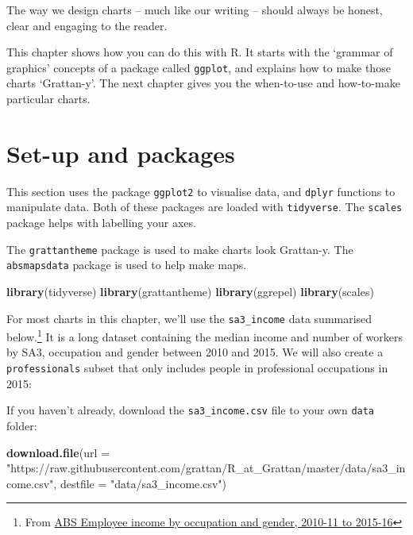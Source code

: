 \documentclass[
]{book}
\newenvironment{Shaded}{\begin{snugshade}}{\end{snugshade}}
\newcommand{\DataTypeTok}[1]{\textcolor[rgb]{0.13,0.29,0.53}{#1}}
\newcommand{\KeywordTok}[1]{\textcolor[rgb]{0.13,0.29,0.53}{\textbf{#1}}}
\newcommand{\NormalTok}[1]{#1}
\newcommand{\StringTok}[1]{\textcolor[rgb]{0.31,0.60,0.02}{#1}}
\begin{document}
The way we design charts -- much like our writing -- should always be honest, clear and engaging to the reader.

This chapter shows how you can do this with R. It starts with the `grammar of graphics' concepts of a package called \texttt{ggplot}, and explains how to make those charts `Grattan-y'. The next chapter gives you the when-to-use and how-to-make particular charts.

\hypertarget{set-up-and-packages}{%
\section{Set-up and packages}\label{set-up-and-packages}}

This section uses the package \texttt{ggplot2} to visualise data, and \texttt{dplyr} functions to manipulate data. Both of these packages are loaded with \texttt{tidyverse}. The \texttt{scales} package helps with labelling your axes.

The \texttt{grattantheme} package is used to make charts look Grattan-y. The \texttt{absmapsdata} package is used to help make maps.

\begin{Shaded}
\begin{Highlighting}[]
\KeywordTok{library}\NormalTok{(tidyverse)}
\KeywordTok{library}\NormalTok{(grattantheme)}
\KeywordTok{library}\NormalTok{(ggrepel)}
\KeywordTok{library}\NormalTok{(scales)}
\end{Highlighting}
\end{Shaded}

For most charts in this chapter, we'll use the \texttt{sa3\_income} data summarised below.\footnote{From \href{https://www.abs.gov.au/AUSSTATS/abs@.nsf/DetailsPage/6524.0.55.0022011-2016?OpenDocument}{ABS Employee income by occupation and gender, 2010-11 to 2015-16}} It is a long dataset containing the median income and number of workers by SA3, occupation and gender between 2010 and 2015. We will also create a \texttt{professionals} subset that only includes people in professional occupations in 2015:

If you haven't already, download the \texttt{sa3\_income.csv} file to your own \texttt{data} folder:

\begin{Shaded}
\begin{Highlighting}[]
\KeywordTok{download.file}\NormalTok{(}\DataTypeTok{url =} \StringTok{"https://raw.githubusercontent.com/grattan/R\_at\_Grattan/master/data/sa3\_income.csv"}\NormalTok{,}
              \DataTypeTok{destfile =} \StringTok{"data/sa3\_income.csv"}\NormalTok{)}
\end{Highlighting}
\end{Shaded}
\end{document}
